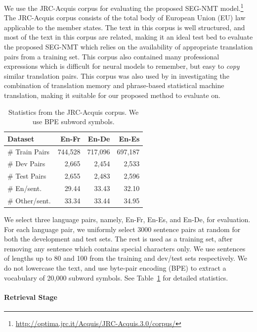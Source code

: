 We use the JRC-Acquis corpus\citep{steinberger2006jrc} for evaluating the proposed SEG-NMT model.\footnote{
\url{http://optima.jrc.it/Acquis/JRC-Acquis.3.0/corpus/}
} The JRC-Acquis corpus consists of the total body of European Union (EU) law applicable to the member states. The text in this corpus is well structured, and most of the text in this corpus are related, making it an ideal test bed to evaluate the proposed SEG-NMT which relies on the availability of appropriate translation pairs from a training set. 
This corpus also contained  many professional expressions which is difficult for neural models to remember, but easy to {\it copy} similar translation pairs.
This corpus was also used by \citep{li2016phrase} in investigating the combination of translation memory and phrase-based statistical machine translation, making it suitable for our proposed method to evaluate on. 

\begin{table}[htpb]
\centering
\begin{tabular}{l|r|r|r}
\toprule
 Dataset& En-Fr & En-De  & En-Es\\
\midrule
\# Train Pairs &744,528 &717,096 &697,187 \\
\# Dev Pairs &2,665 &2,454 &2,533  \\
\# Test Pairs &2,655 &2,483 &2,596  \\
\midrule
\# En/sent. &29.44&33.43 &32.10  \\
\# Other/sent. &33.34 &33.44 &34.95  \\
\bottomrule
\end{tabular}
\caption{\label{cp4.table.dataset} Statistics from the JRC-Acquis corpus. We use BPE subword symbols.}
\end{table}

We select three language pairs, namely, En-Fr, En-Es, and En-De, for evaluation. For each language pair, we uniformly select 3000 sentence pairs at random for both the development and test sets. The rest is used as a training set, after removing any sentence which contains special characters only. We use sentences of lengths up to 80 and 100 from the training and dev/test sets respectively. We do not lowercase the text, and use byte-pair encoding (BPE)\citep{sennrich2015neural} to extract a vocabulary of 20,000 subword symbols. See Table~\ref{cp4.table.dataset} for detailed statistics.

\paragraph{Retrieval Stage}

